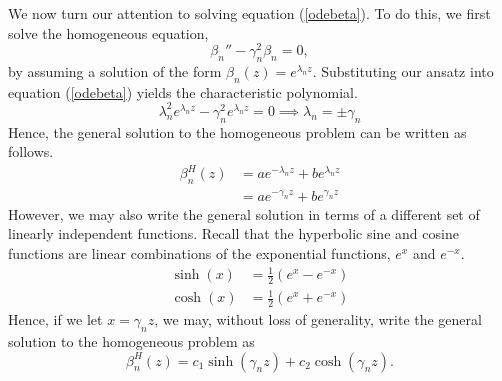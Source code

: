 We now turn our attention to solving equation (\ref{odebeta}). To do this, we first solve the homogeneous equation, 
\begin{equation}
    \beta_n'' - \gamma_n^2 \beta_n = 0,
    \label{odebeta}
\end{equation}
by assuming a solution of the form $\beta_n(z) = e^{\lambda_n z}$. Substituting our ansatz into equation (\ref{odebeta}) yields the characteristic polynomial.
\begin{equation}
    \lambda_n^2 e^{\lambda_n z} - \gamma_n^2 e^{\lambda_n z} = 0 \implies \lambda_n = \pm\gamma_n
\end{equation}
Hence, the general solution to the homogeneous problem can be written as follows.
\begin{align}
    \beta_n^H(z) &= a e^{-\lambda_n z} + b e^{\lambda_n z}\\
    &= a e^{-\gamma_n z} + b e^{\gamma_n z}
\end{align}
However, we may also write the general solution in terms of a different set of linearly independent functions. Recall that the hyperbolic sine and cosine functions are linear combinations of the exponential functions, $e^x$ and $e^{-x}$.
\begin{align}
    \sinh(x) &= \frac{1}{2}\left(e^{x} - e^{-x}\right)\\
    \cosh(x) &= \frac{1}{2}\left(e^{x} + e^{-x}\right)
\end{align}
Hence, if we let $x = \gamma_n z$, we may, without loss of generality, write the general solution to the homogeneous problem as 
\begin{equation}
    \boxed{\beta_n^H(z) = c_1 \sinh(\gamma_n z) + c_2 \cosh(\gamma_n z).}
\end{equation}